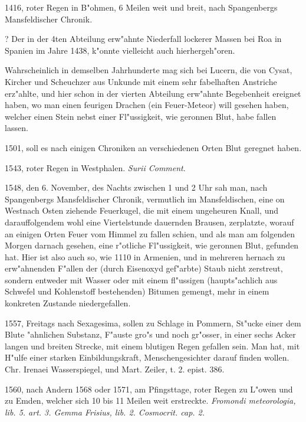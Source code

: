 \documentclass[a4paper, 11pt, oneside, polutonikogreek, german]{article}
\begin{document}
1416, roter Regen in B"ohmen, 6 Meilen weit und breit, nach Spangenbergs Mansfeldischer Chronik.

? Der in der 4ten Abteilung erw"ahnte Niederfall lockerer Massen bei Roa in Spanien im Jahre 1438, k"onnte vielleicht auch hierhergeh"oren.

Wahrscheinlich in demselben Jahrhunderte mag sich bei Lucern, die von Cysat, Kircher und Scheuchzer aus Unkunde mit einem sehr fabelhaften Anstriche erz"ahlte, und hier schon in der vierten Abteilung erw"ahnte Begebenheit ereignet haben, wo man einen feurigen Drachen (ein Feuer-Meteor) will gesehen haben, welcher einen Stein nebst einer Fl"ussigkeit, wie geronnen Blut, habe fallen lassen.

1501, soll es nach einigen Chroniken an verschiedenen Orten Blut geregnet haben.

1543, roter Regen in Westphalen. \emph{Surii Comment}.

1548, den 6. November, des Nachts zwischen 1 und 2 Uhr sah man, nach Spangenbergs Mansfeldischer Chronik, vermutlich im Mansfeldischen, eine on Westnach Osten ziehende Feuerkugel, die mit einem ungeheuren Knall, und darauffolgendem wohl eine Viertelstunde dauernden Brausen, zerplatzte, worauf an einigen Orten Feuer vom Himmel zu fallen schien, und als man am folgenden Morgen darnach gesehen, eine r"otliche Fl"ussigkeit, wie geronnen Blut, gefunden hat. Hier ist also auch so, wie 1110 in Armenien, und in mehreren hernach zu erw"ahnenden F"allen der (durch Eisenoxyd gef"arbte) Staub nicht zerstreut, sondern entweder mit Wasser oder mit einem fl"ussigen (haupts"achlich aus Schwefel und Kohlenstoff bestehenden) Bitumen gemengt, mehr in einem konkreten Zustande niedergefallen.

1557, Freitags nach Sexagesima, sollen zu Schlage in Pommern, St"ucke einer dem Blute "ahnlichen Substanz, F"auste gro"s und noch gr"osser, in einer sechs Acker langen und breiten Strecke, mit einem blutigen Regen gefallen sein. Man hat, mit H"ulfe einer starken Einbildungskraft, Menschengesichter darauf finden wollen. Chr. Irenaei Wasserspiegel, und Mart. Zeiler, t. 2. epist. 386.

1560, nach Andern 1568 oder 1571, am Pfingsttage, roter Regen zu L"owen und zu Emden, welcher sich 10 bis 11 Meilen weit erstreckte. \emph{Fromondi meteorologia, lib. 5. art. 3. Gemma Frisius, lib. 2. Cosmocrit. cap. 2.}
\end{document}
